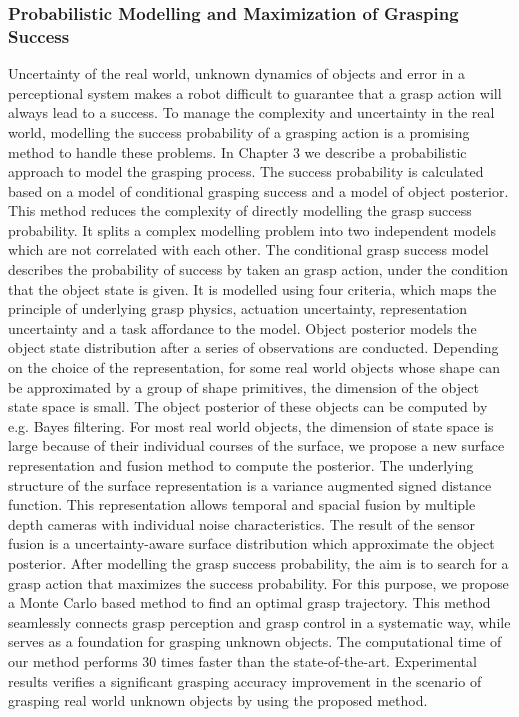 \subsubsection{Probabilistic Modelling and Maximization of Grasping Success}
Uncertainty of the real world, unknown dynamics of objects and error in a perceptional system makes a robot difficult to guarantee that a grasp action will  always lead to a success. To manage the complexity and uncertainty in the real world, modelling the success probability of a grasping action is a promising method to handle these problems. In Chapter 3 we describe a probabilistic approach to model the grasping process. The success probability is calculated based on a model of conditional grasping success and a model of object posterior. This method reduces the complexity of directly modelling the grasp success probability. It splits a complex modelling problem into two independent models which are not correlated with each other. The conditional grasp success model describes the probability of success by taken an grasp action, under the condition that the object state is given. It is modelled using four criteria, which maps the principle of underlying grasp physics, actuation uncertainty, representation uncertainty and a task  affordance to the model. Object posterior models the object state distribution after a series of observations are conducted. Depending on the choice of the representation, for some real world objects whose shape can be approximated by a group of shape primitives, the dimension of the object state space is small. The object posterior of these objects can be computed by e.g. Bayes filtering. For most real  world objects, the dimension of state space is large because of their individual courses of the surface, we propose a new surface representation and fusion method to compute the posterior. The underlying structure of the surface representation is a variance augmented signed distance function. This representation allows temporal and spacial fusion by multiple depth cameras with  individual noise characteristics. The result of the sensor fusion is a uncertainty-aware surface distribution which approximate the object posterior. After modelling the grasp success probability, the aim  is to search for a grasp action that maximizes the success probability. For this purpose, we propose a Monte Carlo based method to find an optimal grasp trajectory. This method seamlessly connects grasp perception and grasp control in a systematic way, while serves as a foundation for grasping unknown objects. The computational time of our method performs 30 times faster than the state-of-the-art. Experimental results verifies a significant grasping accuracy improvement in the scenario of  grasping real world unknown objects by using the proposed method. 



